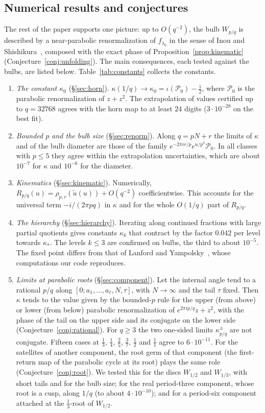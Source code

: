 \documentclass[11pt]{amsart}
\theoremstyle{definition}
\theoremstyle{remark}
\newcommand{\PP}{\mathcal{P}_0}
\begin{document}
\subsection{Numerical results and conjectures}
The rest of the paper supports one picture: up to $O(q^{-2})$, the bulb $W_{p/q}$ is described by a near-parabolic renormalization of $f_{\lambda_0}$ in the sense of Inou and Shishikura~\cite{IS}, composed with the exact phase of Proposition~\ref{prop:kinematic} (Conjecture~\ref{conj:unfolding}). The main consequences, each tested against the bulbs, are listed below. Table~\ref{tab:constants} collects the constants.
\begin{enumerate}
\item \emph{The constant $\kappa_0$} (\S\ref{sec:horn}). $\kappa(1/q)\to\kappa_0=\iota(\PP)-\frac12$, where $\PP$ is the parabolic renormalization of $z+z^2$. The extrapolation of values certified up to $q=32768$ agrees with the horn map to at least $24$ digits ($3\cdot10^{-28}$ on the best fit).
\item \emph{Bounded $p$ and the bulb size} (\S\ref{sec:renorm}). Along $q=pN+r$ the limits of $\kappa$ and of the bulb diameter are those of the family $e^{-2\pi ir/p}e^{u/p^2}\PP$. In all classes with $p\le5$ they agree within the extrapolation uncertainties, which are about $10^{-7}$ for $\kappa$ and $10^{-6}$ for the diameter.
\item \emph{Kinematics} (\S\ref{sec:kinematic}). Numerically, $R_{p/q}(u)=\rho_{p,r}(\tilde u(u))+O(q^{-2})$ coefficientwise. This accounts for the universal term $-i/(2\pi pq)$ in $\kappa$ and for the whole $O(1/q)$ part of $R_{p/q}$.
\item \emph{The hierarchy} (\S\ref{sec:hierarchy}). Iterating along continued fractions with large partial quotients gives constants $\kappa_k$ that contract by the factor $0.042$ per level towards $\kappa_*$. The levels $k\le3$ are confirmed on bulbs, the third to about $10^{-5}$. The fixed point differs from that of Lanford and Yampolsky~\cite{LY}, whose computations our code reproduces.
\item \emph{Limits at parabolic roots} (\S\ref{sec:component}). Let the internal angle tend to a rational $p/q$ along $[0;a_1,\ldots,a_\ell,N,\tau]$, with $N\to\infty$ and the tail $\tau$ fixed. Then $\kappa$ tends to the value given by the bounded-$p$ rule for the upper (from above) or lower (from below) parabolic renormalization of $e^{2\pi ip/q}z+z^2$, with the phase of the tail on the upper side and its conjugate on the lower side (Conjecture~\ref{conj:rational}). For $q\ge3$ the two one-sided limits $\kappa^\pm_{p/q}$ are not conjugate. Fifteen cases at $\frac13$, $\frac14$, $\frac25$, $\frac37$, $\frac12$ and $\frac11$ agree to $6\cdot10^{-11}$. For the satellites of another component, the root germ of that component (the first-return map of the parabolic cycle at its root) plays the same role (Conjecture~\ref{conj:root}). We tested this for the discs $W_{1/2}$ and $W_{1/3}$, with short tails and for the bulb size; for the real period-three component, whose root is a cusp, along $1/q$ (to about $4\cdot10^{-10}$); and for a period-six component attached at the $\frac13$-root of $W_{1/2}$.

\end{enumerate}
\end{document}
